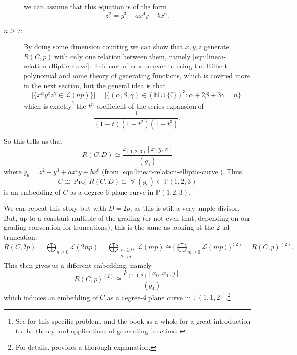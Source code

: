 \documentclass[10pt,notitlepage]{article}
\numberwithin{equation}{subsection}
\DeclareMathOperator{\proj}{Proj}
\DeclareMathOperator{\van}{\mathbb{V}}
\newcommand{\pee}{\mathbb{P}}
\newcommand{\nn}{\mathbb{N}}
\begin{document}
\begin{example}
\begin{description}
{                    } we can assume that this equation is of the form
                    \begin{equation}\label{eqn:linear-relation-elliptic-curve}
                        z^2 = y^3+ax^4y+bx^6.
                    \end{equation}
                \item[$n\geqslant7$:] By doing some dimension counting we can show that $x,y,z$ generate $R(C,p)$ with only one relation between them, namely \cref{eqn:linear-relation-elliptic-curve}.
                    This sort of crosses over to using the Hilbert polynomial and some theory of generating functions, which is covered more in the next section, but the general idea is that 
                    \[
                        \big|\{x^\alpha y^\beta z^\gamma\in\mathcal{L}(np)\}\big| = \big|\{(\alpha,\beta,\gamma)\in(\nn\cup\{0\})^3 : \alpha+2\beta+3\gamma=n\}\big|
                    \]
                    which is exactly\footnote{%
                        See \cite[Section~3.15]{Wilf:2005to} for this specific problem, and the book as a whole for a great introduction to the theory and applications of generating functions.
                    } the $t^n$ coefficient of the series expansion of
                    \[
                        \frac{1}{(1-t)(1-t^2)(1-t^3)}.
                    \]
            \end{description}

            \bigskip

            So this tells us that
            \[
                R(C,D) \cong \frac{k_{(1,2,3)}[x,y,z]}{(g_6)}
            \]
            where $g_6=z^2-y^3+ax^4y+bx^6$ (from \cref{eqn:linear-relation-elliptic-curve}).
            Thus
            \[
                C \cong \proj R(C,D) \cong \van(g_6)\subset\pee(1,2,3)
            \]
            is an embedding of $C$ as a degree-$6$ plane curve in $\pee(1,2,3)$.

            \bigskip

            We can repeat this story but with $D=2p$, as this is still a very-ample divisor.
            But, up to a constant multiple of the grading (or not even that, depending on our grading convention for truncations), this is the same as looking at the $2$-nd truncation:
            \[
                R(C,2p) = \bigoplus_{n\geqslant0} \mathcal{L}(2np) = \bigoplus_{\substack{m\geqslant0\\2\mid m}} \mathcal{L}(mp) \cong \bigg(\bigoplus_{m\geqslant0}\mathcal{L}(mp)\bigg)^{(2)} = R(C,p)^{(2)}.
            \]
            This then gives us a different embedding, namely
            \[
                R(C,p)^{(2)} \cong \frac{k_{(1,1,2)}[x_0,x_1,y]}{(g_4)}
            \]
            which induces an embedding of $C$ as a degree-$4$ plane curve in $\pee(1,1,2)$.\footnote{%
                For details, \cite[Section~12.6]{IanoFletcher:2015wc} provides a thorough explanation.
            }


\end{example}
\end{document}

